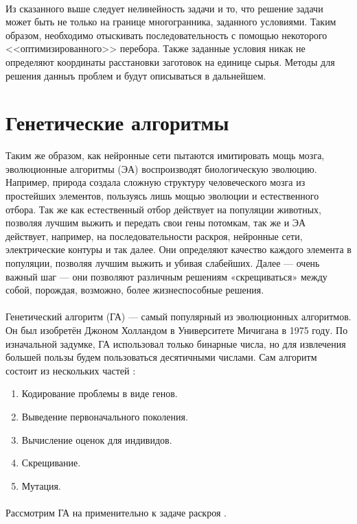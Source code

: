 \documentclass[14pt]{extarticle}
\begin{document}
	\paragraph{}
	Из сказанного выше следует нелинейность задачи и то, что решение задачи может быть не только на границе многогранника, заданного условиями. Таким образом, необходимо отыскивать последовательность с помощью некоторого <<оптимизированного>> перебора. Также заданные условия никак не определяют координаты расстановки заготовок на единице сырья. Методы для решения данныъ проблем и будут описываться в дальнейшем.
	\newpage 
	\section{Генетические алгоритмы}
	Таким же образом, как нейронные сети пытаются имитировать мощь мозга, эволюционные алгоритмы (ЭА) воспроизводят биологическую эволюцию. Например, природа создала сложную структуру человеческого мозга из простейших элементов, пользуясь лишь мощью эволюции и естественного отбора. Так же как естественный отбор действует на популяции животных, позволяя лучшим выжить и передать свои гены потомкам, так же и ЭА действует, например, на последовательности раскроя, нейронные сети, электрические контуры и так далее. Они определяют качество каждого элемента в популяции, позволяя
	лучшим выжить и убивая слабейших. Далее --- очень важный шаг --- они позволяют различным решениям «скрещиваться» между собой, порождая, возможно, более жизнеспособные
	решения.
	\paragraph{}
	Генетический алгоритм (ГА) --- самый популярный из эволюционных алгоритмов. Он был изобретён Джоном Холландом в Университете Мичигана в 1975 году. По изначальной задумке, ГА использовал только бинарные числа, но для извлечения большей пользы будем пользоваться десятичными числами. Сам алгоритм состоит из нескольких частей \cite{McLeod}:
	\begin{enumerate}
		\item Кодирование проблемы в виде генов.
		\item Выведение первоначального поколения.
		\item Вычисление оценок для индивидов.
		\item Скрещивание.
		\item Мутация.
	\end{enumerate}
	\paragraph{}
	Рассмотрим ГА на применительно к задаче раскроя \cite{China}.
\end{document}
